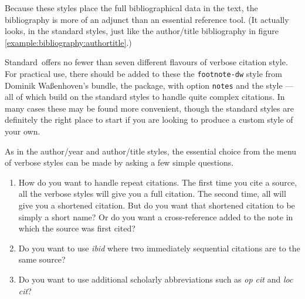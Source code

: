 Because these styles place the full bibliographical data in the text,
the bibliography is more of an adjunct than an essential reference
tool. (It actually looks, in the standard styles, just like the
author/title bibliography in figure
\ref{example:bibliography:authortitle}.)

Standard\biblatex\ offers no fewer than seven different flavours of
verbose citation style. For practical use, there should be added to
these the \verb|footnote-dw| style from Dominik Waßenhoven's
 bundle, the 
package, with option \verb|notes| and the  style ---
all of which build on the standard styles to handle quite complex
citations. In many cases these may be found more convenient, though
the standard styles are definitely the right place to start if you are
looking to produce a custom style of your own.

As in the author/year and author/title styles, the essential choice
from the menu of verbose styles can be made by asking a few simple
questions.
\begin{enumerate}
\item How do you want to handle repeat citations. The first time you
  cite a source, all the verbose styles will give you a full
  citation. The second time, all will give you a shortened
  citation. But do you want that shortened citation to be simply a
  short name? Or do you want a cross-reference added to the note in
  which the source was first cited?
\item Do you want to use \emph{ibid} where two immediately sequential citations
  are to the same source?
\item Do you want to use additional scholarly abbreviations such as
  \emph{op cit} and \emph{loc cit}?
\end{enumerate}

